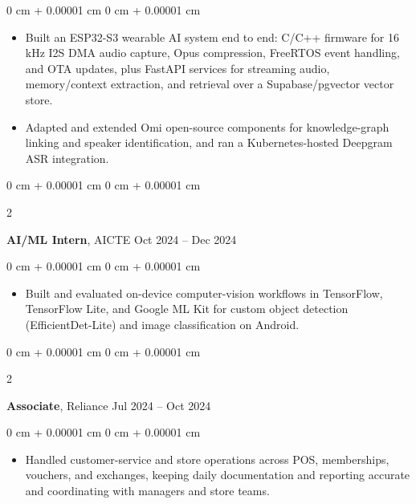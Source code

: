 \documentclass[10pt, letterpaper]{article}
\newenvironment{highlights}{
    \begin{itemize}[
        topsep=0.10 cm,
        parsep=0.10 cm,
        partopsep=0pt,
        itemsep=0pt,
        leftmargin=0 cm + 10pt
    ]
}{
    \end{itemize}
} %
\newenvironment{onecolentry}{
    \begin{adjustwidth}{
        0 cm + 0.00001 cm
    }{
        0 cm + 0.00001 cm
    }
}{
    \end{adjustwidth}
} %
\newenvironment{twocolentry}[2][]{
    \onecolentry
    \def\secondColumn{#2}
    \setcolumnwidth{\fill, 4.5 cm}
    \begin{paracol}{2}
}{
    \switchcolumn \raggedleft \secondColumn
    \end{paracol}
    \endonecolentry
} %
\begin{document}
        \vspace{0.06 cm}
        \begin{onecolentry}
            \begin{highlights}
                \item Built an ESP32-S3 wearable AI system end to end: C/C++ firmware for 16 kHz I2S DMA audio capture, Opus compression, FreeRTOS event handling, and OTA updates, plus FastAPI services for streaming audio, memory/context extraction, and retrieval over a Supabase/pgvector vector store.
                \item Adapted and extended Omi open-source components for knowledge-graph linking and speaker identification, and ran a Kubernetes-hosted Deepgram ASR integration.
            \end{highlights}
        \end{onecolentry}

        \vspace{0.12 cm}

        \begin{twocolentry}{
            Oct 2024 -- Dec 2024
        }
            \textbf{AI/ML Intern}, AICTE\end{twocolentry}

        \vspace{0.06 cm}
        \begin{onecolentry}
            \begin{highlights}
                \item Built and evaluated on-device computer-vision workflows in TensorFlow, TensorFlow Lite, and Google ML Kit for custom object detection (Ef\mbox{f}icientDet-Lite) and image classification on Android.
            \end{highlights}
        \end{onecolentry}

        \vspace{0.12 cm}

        \begin{twocolentry}{
            Jul 2024 -- Oct 2024
        }
            \textbf{Associate}, Reliance\end{twocolentry}

        \vspace{0.06 cm}
        \begin{onecolentry}
            \begin{highlights}
                \item Handled customer-service and store operations across POS, memberships, vouchers, and exchanges, keeping daily documentation and reporting accurate and coordinating with managers and store teams.
            \end{highlights}
        \end{onecolentry}
\end{document}
